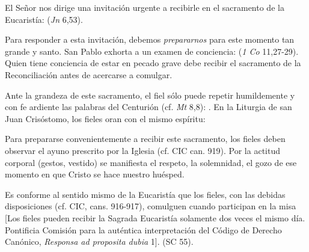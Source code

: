 
\begin{ccebody}
 El Señor nos dirige una invitación urgente a recibirle en el sacramento de la Eucaristía:  (\textit{Jn} 6,53).

 Para responder a esta invitación, debemos \textit{prepararnos} para este momento tan grande y santo. San Pablo exhorta a un examen de conciencia:  (\textit{1 Co} 11,27-29). Quien tiene conciencia de estar en pecado grave debe recibir el sacramento de la Reconciliación antes de acercarse a comulgar.

 Ante la grandeza de este sacramento, el fiel sólo puede repetir humildemente y con fe ardiente las palabras del Centurión (cf. \textit{Mt} 8,8): . En la Liturgia de san Juan Crisóstomo, los fieles oran con el mismo espíritu:


 Para prepararse convenientemente a recibir este sacramento, los fieles deben observar el ayuno prescrito por la Iglesia (cf. CIC can. 919). Por la actitud corporal (gestos, vestido) se manifiesta el respeto, la solemnidad, el gozo de ese momento en que Cristo se hace nuestro huésped.

 Es conforme al sentido mismo de la Eucaristía que los fieles, con las debidas disposiciones (cf. CIC, cans. 916-917), comulguen cuando participan en la misa [Los fieles pueden recibir la Sagrada Eucaristía solamente dos veces el mismo día. Pontificia Comisión para la auténtica interpretación del Código de Derecho Canónico, \textit{Responsa ad proposita dubia} 1].  (SC 55).


\end{ccebody}
